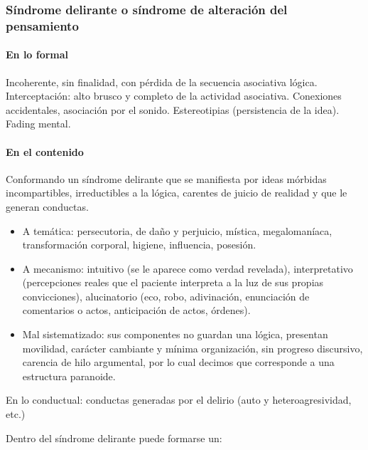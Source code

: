 \subsubsection*{Síndrome delirante o síndrome de alteración del pensamiento}
\paragraph*{En lo formal}
Incoherente, sin finalidad, con pérdida de la secuencia asociativa lógica. Interceptación: alto brusco y completo de la actividad asociativa. Conexiones accidentales, asociación por el sonido. Estereotipias (persistencia de la idea). Fading mental.
\paragraph*{En el contenido}
Conformando un síndrome delirante que se manifiesta por ideas mórbidas incompartibles, irreductibles a la lógica, carentes de juicio de realidad y que le generan conductas.
\begin{itemize}
    \item A temática: persecutoria, de daño y perjuicio, mística, megalomaníaca, transformación corporal, higiene, influencia, posesión.
    \item A mecanismo: intuitivo (se le aparece como verdad revelada), interpretativo (percepciones reales que el paciente interpreta a la luz de sus propias convicciones), alucinatorio (eco, robo, adivinación, enunciación de comentarios o actos, anticipación de actos, órdenes).
    \item Mal sistematizado: sus componentes no guardan una lógica, presentan movilidad, carácter cambiante y mínima organización, sin progreso discursivo, carencia de hilo argumental, por lo cual decimos que corresponde a una estructura paranoide.
\end{itemize}

En lo conductual: conductas generadas por el delirio (auto y heteroagresividad, etc.)

Dentro del síndrome delirante puede formarse un:
